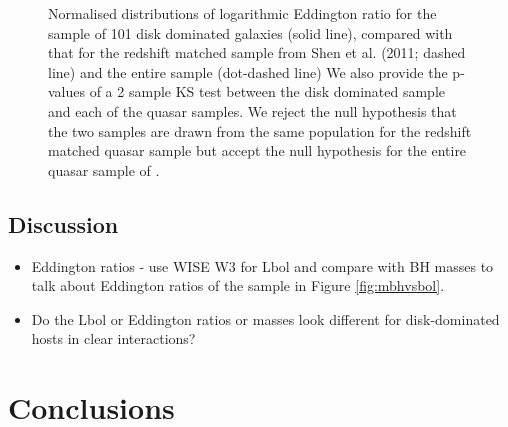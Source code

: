 \begin{figure}
\caption[Eddington ratio distribution of the bulgeless AGN sample]{Normalised distributions of logarithmic Eddington ratio for the sample of 101 disk dominated galaxies (solid line), compared with that for the redshift matched sample from Shen et al. (2011; dashed line) and the entire sample (dot-dashed line) We also provide the p-values of a 2 sample KS test between the disk dominated sample and each of the quasar samples. We reject the null hypothesis that the two samples are drawn from the same population for the redshift matched quasar sample but accept the null hypothesis for the entire quasar sample of \citet{shen11}.  
}
\label{fig:eddratioshen}
\end{figure}


%
%  
\subsection{Discussion}\label{sec:intdiscussion}
%
%

\begin{itemize}
\item Eddington ratios - use WISE W3 for Lbol and compare with BH masses to talk about Eddington ratios of the sample in Figure \ref{fig:mbhvsbol}.


\item Do the Lbol or Eddington ratios or masses look different for disk-dominated hosts in clear interactions?

\end{itemize}

\section{Conclusions}\label{sec:agnconclusion}
